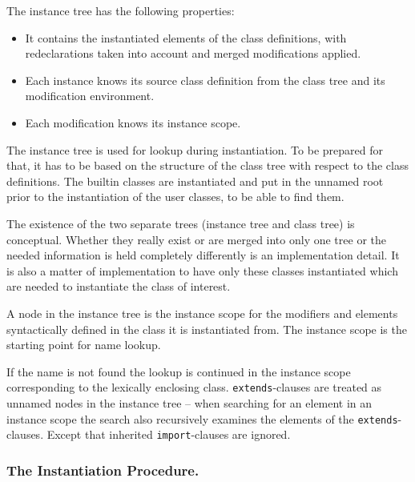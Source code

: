 The instance tree has the following properties:
\begin{itemize}
\item
  It contains the instantiated elements of the class definitions, with
  redeclarations taken into account and merged modifications applied.
\end{itemize}

\begin{itemize}
\item
  Each instance knows its source class definition from the class tree
  and its modification environment.
\item
  Each modification knows its instance scope.
\end{itemize}

The instance tree is used for lookup during instantiation. To be
prepared for that, it has to be based on the structure of the class tree
with respect to the class definitions. The builtin classes are
instantiated and put in the unnamed root prior to the instantiation of
the user classes, to be able to find them.

\begin{nonnormative}
The existence of the two separate trees (instance tree and
class tree) is conceptual. Whether they really exist or are merged into
only one tree or the needed information is held completely differently
is an implementation detail. It is also a matter of implementation to
have only these classes instantiated which are needed to instantiate the
class of interest.
\end{nonnormative}

A node in the instance tree is the instance scope for the modifiers and
elements syntactically defined in the class it is instantiated from. The
instance scope is the starting point for name lookup.

\begin{nonnormative}
If the name is not found the lookup is continued in the instance scope corresponding to the lexically enclosing class.
\lstinline!extends!-clauses are treated as unnamed nodes in the instance tree -- when searching for an element in an instance scope the search also recursively examines the elements of the \lstinline!extends!-clauses.
Except that inherited \lstinline!import!-clauses are ignored.
\end{nonnormative}

\subsubsection{The Instantiation Procedure.}\label{the-instantiation-procedure}

